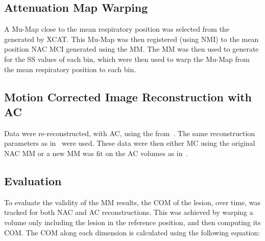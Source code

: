             \subsection{Attenuation Map Warping} \label{sec:pet_ct_respiratory_motion_correction_with_a_single_attenuation_map_using_nac_derived_deformation_fields_methods_attenuation_map_warping}
                A \gls{Mu-Map} close to the mean respiratory position was selected from the  generated by \gls{XCAT}. This \gls{Mu-Map} was then registered (using \gls{NMI}) to the mean position \gls{NAC} \gls{MCI} generated using the \gls{MM}. The \gls{MM} was then used to generate  for the \gls{SS} values of each bin, which were then used to warp the \gls{Mu-Map} from the mean respiratory position to each bin.
            
            \subsection{Motion Corrected Image Reconstruction with AC} \label{sec:pet_ct_respiratory_motion_correction_with_a_single_attenuation_map_using_nac_derived_deformation_fields_methods_attenuation_corrected_image_reconstruction}
                Data were re-reconstructed, with \gls{AC}, using the  from~. The same reconstruction parameters as in~ were used. These data were then either \gls{MC} using the original \gls{NAC} \gls{MM} or a new \gls{MM} was fit on the \gls{AC} volumes as in~.
            
            \subsection{Evaluation} \label{sec:pet_ct_respiratory_motion_correction_with_a_single_attenuation_map_using_nac_derived_deformation_fields_methods_evaluation}
                To evaluate the validity of the \gls{MM} results, the \gls{COM} of the lesion, over time, was tracked for both \gls{NAC} and \gls{AC} reconstructions. This was achieved by warping a volume only including the lesion in the reference position, and then computing its \gls{COM}. The \gls{COM} along each dimension is calculated using the following equation:
                
